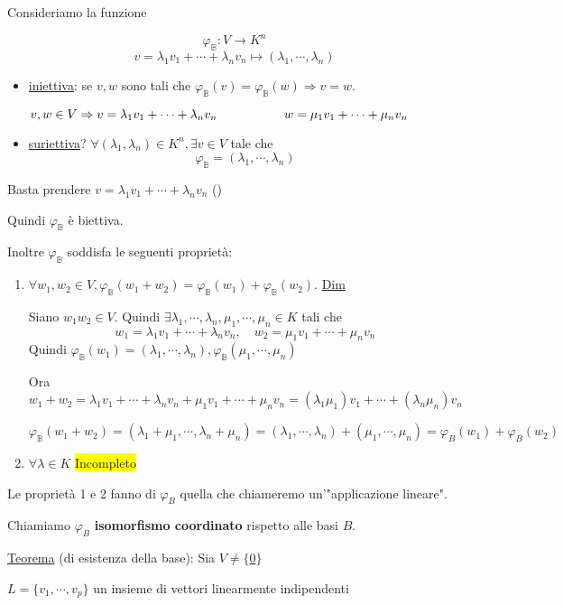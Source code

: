 \documentclass{article}
\newcommand{\hl}[1]{\colorbox{yellow}{#1}}
\newcommand{\ul}[1]{\underline{#1}}
\begin{document}
Consideriamo la funzione

$$\varphi_\mathbb{B}:V\rightarrow K^n$$
$$v=\lambda_1v_1+\cdots+\lambda_nv_n\mapsto(\lambda_1,\cdots,\lambda_n)$$
\begin{itemize}
	\item \ul{iniettiva}: se $v,w$ sono tali che $\varphi_\mathbb{B}(v)=\varphi_\mathbb{B}(w)\Rightarrow v=w$.

	      $v,w\in V\Rightarrow v=\lambda_1v_1+\cdots+\lambda_nv_n\\\qquad\qquad\quad\ w=\mu_1v_1+\cdots+\mu_nv_n$
	\item \ul{suriettiva}? $\forall(\lambda_1,\lambda_n)\in K^n,\exists v\in V$ tale che
	      $$\varphi_\mathbb{B}=(\lambda_1,\cdots,\lambda_n)$$
\end{itemize}
Basta prendere $v=\lambda_1v_1+\cdots+\lambda_nv_n$ (\boxed)

Quindi $\varphi_\mathbb{B}$ è biettiva.

Inoltre $\varphi_\mathbb{B}$ soddisfa le seguenti proprietà:
\begin{enumerate}
	\item $\forall w_1,w_2\in V,\varphi_\mathbb{B}(w_1+w_2)=\varphi_\mathbb{B}(w_1)+\varphi_\mathbb{B}(w_2)$.
	      \ul{Dim}

	      Siano $w_1w_2\in V$. Quindi $\exists\lambda_1,\cdots,\lambda_n,\mu_1,\cdots,\mu_n\in K$ tali che
	      $$w_1=\lambda_1v_1+\cdots+\lambda_nv_n,\quad w_2=\mu_1v_1+\cdots+\mu_nv_n$$
	      Quindi $\varphi_\mathbb{B}(w_1)=(\lambda_1,\cdots,\lambda_n),\varphi_\mathbb{B}(\mu_1,\cdots,\mu_n)$

	      Ora $w_1+w_2=\lambda_1v_1+\cdots+\lambda_nv_n+\mu_1v_1+\cdots+\mu_nv_n=(\lambda_1\mu_1)v_1+\cdots+(\lambda_n\mu_n)v_n$

	      $\varphi_\mathbb{B}(w_1+w_2)=(\lambda_1+\mu_1,\cdots,\lambda_n+\mu_n)=(\lambda_1,\cdots,\lambda_n)+(\mu_1,\cdots,\mu_n)=\varphi_B(w_1)+\varphi_B(w_2)$
	\item $\forall\lambda\in K$ \hl{Incompleto}
\end{enumerate}

Le proprietà 1 e 2 fanno di $\varphi_B$ quella che chiameremo un'"applicazione lineare".

Chiamiamo $\varphi_B$ \textbf{isomorfismo coordinato} rispetto alle basi $B$.

\ul{Teorema} (di esistenza della base): Sia $V\not=\{$\ul{0}$\}$

$L=\{v_1,\cdots,v_p\}$ un insieme di vettori linearmente indipendenti
\end{document}
